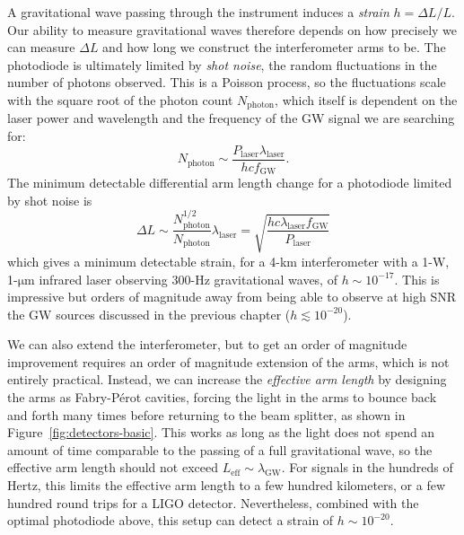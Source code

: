 A gravitational wave passing through the instrument induces a \textit{strain} $h = \Delta L / L$.
Our ability to measure gravitational waves therefore depends on how precisely we can measure $\Delta L$ and how long we construct the interferometer arms to be.
The photodiode is ultimately limited by \textit{shot noise}, the random fluctuations in the number of photons observed.
This is a Poisson process, so the fluctuations scale with the square root of the photon count $N_{\mathrm{photon}}$, which itself is dependent on the laser power and wavelength and the frequency of the GW signal we are searching for:
\begin{equation}
  N_{\mathrm{photon}} \sim \frac{P_{\mathrm{laser}} \lambda_{\mathrm{laser}}}{h c f_{\mathrm{GW}}}.
\end{equation}
The minimum detectable differential arm length change for a photodiode limited by shot noise is
\begin{equation}
  \Delta L \sim \frac{N_{\mathrm{photon}}^{1/2}}{N_{\mathrm{photon}}} \lambda_{\mathrm{laser}} = \sqrt{ \frac{h c \lambda_{\mathrm{laser}} f_{\mathrm{GW}}}{P_{\mathrm{laser}}} }
\end{equation}
which gives a minimum detectable strain, for a 4-km interferometer with a 1-W, 1-$\mathrm{\mu}$m infrared laser observing 300-Hz gravitational waves, of $h \sim 10^{-17}$.
This is impressive but orders of magnitude away from being able to observe at high \ac{SNR} the GW sources discussed in the previous chapter ($h \lesssim 10^{-20}$).

We can also extend the interferometer, but to get an order of magnitude improvement requires an order of magnitude extension of the arms, which is not entirely practical.
Instead, we can increase the \textit{effective arm length} by designing the arms as Fabry-P\'erot cavities, forcing the light in the arms to bounce back and forth many times before returning to the beam splitter, as shown in Figure~\ref{fig:detectors-basic}.
This works as long as the light does not spend an amount of time comparable to the passing of a full gravitational wave, so the effective arm length should not exceed $L_{\mathrm{eff}} \sim \lambda_{\mathrm{GW}}$.
For signals in the hundreds of Hertz, this limits the effective arm length to a few hundred kilometers, or a few hundred round trips for a LIGO detector.
Nevertheless, combined with the optimal photodiode above, this setup can detect a strain of $h \sim 10^{-20}$.

